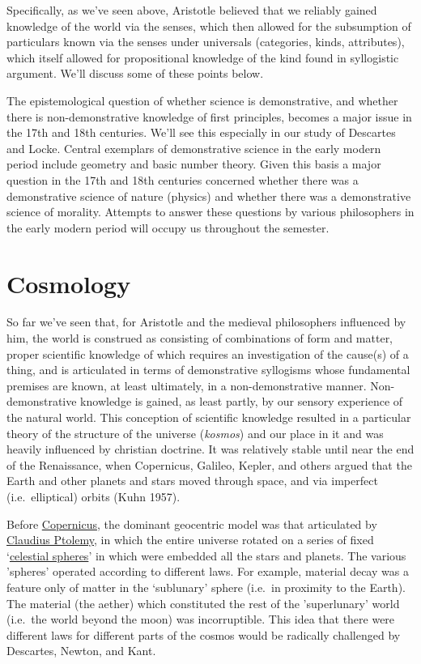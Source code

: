 \documentclass[12pt]{article}
\makeatletter
\newcommand{\citeprocitem}[2]{\hyper@linkstart{cite}{citeproc_bib_item_#1}#2\hyper@linkend}
\makeatother
\begin{document}
Specifically, as we've seen above, Aristotle believed that we reliably gained
knowledge of the world via the senses, which then allowed for the subsumption of
particulars known via the senses under universals (categories, kinds, attributes),
which itself allowed for propositional knowledge of the kind found in syllogistic
argument. We'll discuss some of these points below.

The epistemological question of whether science is demonstrative, and whether there
is non-demonstrative knowledge of first principles, becomes a major issue in the 17th
and 18th centuries. We'll see this especially in our study of Descartes and Locke.
Central exemplars of demonstrative science in the early modern period include
geometry and basic number theory. Given this basis a major question in the 17th and
18th centuries concerned whether there was a demonstrative science of nature
(physics) and whether there was a demonstrative science of morality. Attempts to
answer these questions by various philosophers in the early modern period will occupy
us throughout the semester.

\section{Cosmology}
\label{sec:orge835fbe}
So far we've seen that, for Aristotle and the medieval philosophers influenced by
him, the world is construed as consisting of combinations of form and matter, proper
scientific knowledge of which requires an investigation of the cause(s) of a thing,
and is articulated in terms of demonstrative syllogisms whose fundamental premises
are known, at least ultimately, in a non-demonstrative manner. Non-demonstrative
knowledge is gained, as least partly, by our sensory experience of the natural world.
This conception of scientific knowledge resulted in a particular theory of the
structure of the universe (\emph{kosmos}) and our place in it and was heavily influenced by
christian doctrine. It was relatively stable until near the end of the Renaissance,
when Copernicus, Galileo, Kepler, and others argued that the Earth and other planets
and stars moved through space, and via imperfect (i.e. elliptical) orbits
(\citeprocitem{3}{Kuhn 1957}).

Before \href{http://plato.stanford.edu/entries/copernicus/}{Copernicus}, the dominant geocentric model was that articulated by \href{http://en.wikipedia.org/wiki/Ptolemy\#Astronomy}{Claudius
Ptolemy}, in which the entire universe rotated on a series of fixed `\href{http://en.wikipedia.org/wiki/Celestial\_spheres}{celestial
spheres}' in which were embedded all the stars and planets. The various 'spheres'
operated according to different laws. For example, material decay was a feature only
of matter in the `sublunary' sphere (i.e. in proximity to the Earth). The material
(the aether) which constituted the rest of the 'superlunary' world (i.e. the world
beyond the moon) was incorruptible. This idea that there were different laws for
different parts of the cosmos would be radically challenged by Descartes, Newton, and
Kant.
\end{document}
